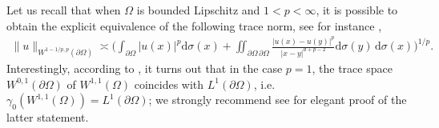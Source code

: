 \documentclass[12pt, reqno]{amsart}%
\theoremstyle{plain}  %
\theoremstyle{definition}  %
\numberwithin{equation}{section}
\renewcommand{\d}{\mathrm{d}}
\begin{document}
Let us recall that when $\Omega$ is bounded Lipschitz and  $1<p<\infty$, it is possible to obtain the explicit equivalence of the following trace norm, see for instance \cite{MiRu15,Mir18},
\begin{align*}
\|u\|_{W^{1-1/p ,p}(\partial\Omega)}\asymp\Big( \int_{\partial \Omega} |u(x)|^p\d \sigma(x)+  \iint_{\partial \Omega\, \partial \Omega} \frac{|u(x)-u(y)|^p}{|x-y|^{d+ p-2}}\d \sigma(y)\, \d \sigma(x)\Big)^{1/p}.
\end{align*}
Interestingly, according to \cite{Gag57}, it turns out that in the case $p=1$,   the trace space $W^{0,1}(\partial\Omega)$ of $W^{1,1}(\Omega)$ coincides with $L^1(\partial\Omega)$, i.e. $\gamma_0 (W^{1,1}(\Omega))= L^1(\partial\Omega)$; we strongly recommend see \cite{Mir15} for elegant proof of the latter statement.
\end{document}
